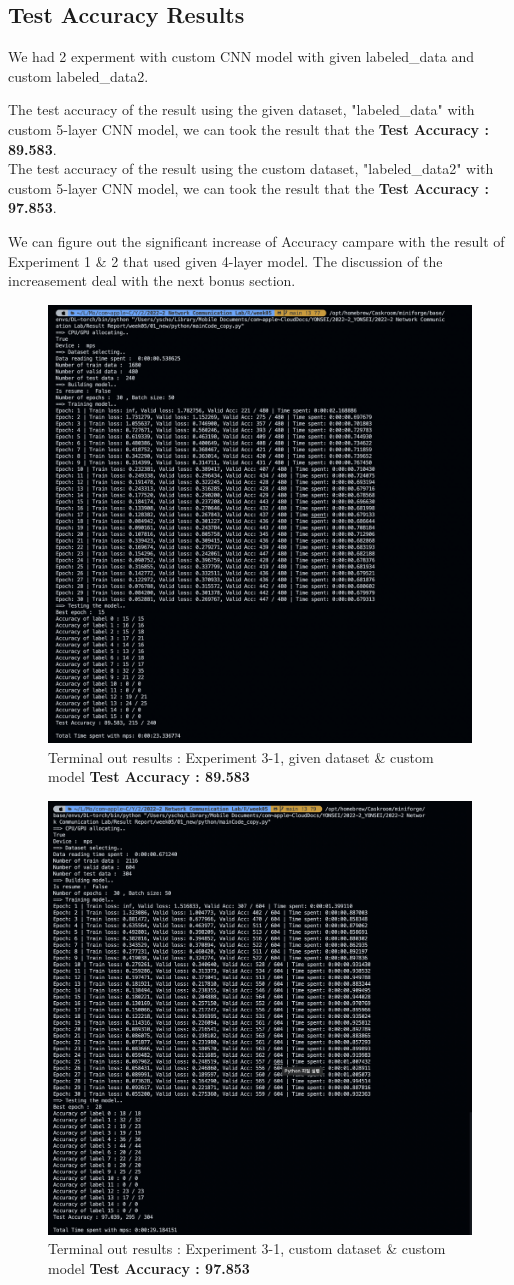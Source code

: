 \subsection{Test Accuracy Results}
We had 2 experment with custom CNN model with given labeled\_data and custom labeled\_data2.

The test accuracy of the result using the given dataset, "labeled\_data" with custom 5-layer CNN model, we can took the result that the \textbf{Test Accuracy : 89.583}.\\
The test accuracy of the result using the custom dataset, "labeled\_data2" with custom 5-layer CNN model, we can took the result that the \textbf{Test Accuracy : 97.853}.

We can figure out the significant increase of Accuracy campare with the result of Experiment 1 \& 2 that used given 4-layer model. The discussion of the increasement deal with the next bonus section.
\clearpage
    \begin{figure}[!h]\centering 
		\includegraphics[width=.67\textwidth]{image/week05/3-3.png}
		\caption{\footnotesize 
		Terminal out results : Experiment 3-1, given dataset \& custom model \textbf{Test Accuracy : 89.583}}
		\vspace{-10pt}
    \end{figure}
    \begin{figure}[!h]\centering 
		\includegraphics[width=.67\textwidth]{image/week05/4-1.png}
		\caption{\footnotesize 
		Terminal out results : Experiment 3-1, custom dataset \& custom model \textbf{Test Accuracy : 97.853}}
		\vspace{-10pt}
    \end{figure}
\clearpage